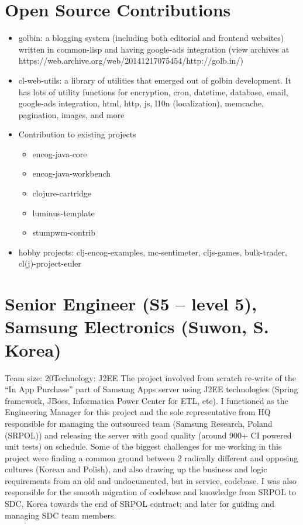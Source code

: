 \documentclass[11pt,a4paper,sans]{moderncv} %
\begin{document}
\section{Open Source Contributions}
         {\begin{itemize}
           \item golbin: a blogging system (including both editorial and frontend websites) written in common-lisp and having google-ads integration (view archives at https://web.archive.org/web/20141217075454/http://golb.in/)
           \item cl-web-utils: a library of utilities that emerged out of golbin development. It has lots of utility functions for encryption, cron, datetime, database, email, google-ads integration, html, http, js, l10n (localization), memcache, pagination, images, and more
           \item Contribution to existing projects
             \begin{itemize}
             \item encog-java-core
             \item encog-java-workbench
             \item clojure-cartridge
             \item luminus-template
             \item stumpwm-contrib
             \end{itemize}
           \item hobby projects: clj-encog-examples, mc-sentimeter, cljs-games, bulk-trader, cl(j)-project-euler
         \end{itemize}}

\section{Senior Engineer (S5 -- level 5), Samsung Electronics (Suwon, S. Korea)}
         {Team size: 20}{Technology: J2EE}
         {The project involved from scratch re-write of the ``In App Purchase'' part of Samsung Apps
server using J2EE technologies (Spring framework, JBoss, Informatica Power Center for
ETL, etc). I functioned as the Engineering Manager for this project and the sole
representative from HQ responsible for managing the outsourced team (Samsung Research,
Poland (SRPOL)) and releasing the server with good quality (around 900+ CI powered unit tests) on schedule. Some of the biggest challenges for me working in this project were finding a
common ground between 2 radically different and opposing cultures (Korean and Polish),
and also drawing up the business and logic requirements from an old and undocumented, but
in service, codebase. I was also responsible for the smooth migration of codebase and
knowledge from SRPOL to SDC, Korea towards the end of SRPOL contract; and later for
guiding and managing SDC team members.}
\end{document}
